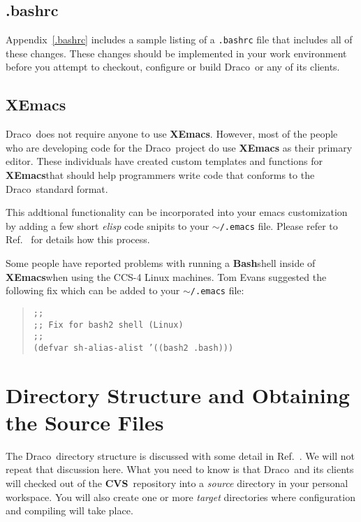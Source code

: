 \documentclass[10pt]{nmemo}
\newcommand{\comp}[1]{\normalfont\normalsize\texttt{#1}}
\newcommand{\draco}{{\normalfont\sffamily Draco}}
\newcommand{\cvs}{{\normalfont\bfseries CVS}}
\newcommand{\xemacs}{{\normalfont\bfseries XEmacs}}
\newcommand{\bash}{{\normalfont\bfseries Bash}}
\begin{document}
\subsection{.bashrc}

Appendix~\ref{.bashrc} includes a sample listing of a \comp{.bashrc}
file that includes all of these changes.  These changes should be
implemented in your work environment before you attempt to checkout,
configure or build \draco\ or any of its clients.

\subsection{\xemacs}

\draco\ does not require anyone to use \xemacs.  However, most of the
people who are developing code for the \draco\ project do use \xemacs
as their primary editor.  These individuals have created custom
templates and functions for \xemacs that should help programmers write 
code that conforms to the \draco\ standard format.

This addtional functionality can be incorporated into your emacs
customization by adding a few short \emph{elisp} code snipits to your
\comp{$\sim$/.emacs} file.  Please refer to Ref.~\cite{xtm:9909} for
details how this process.

Some people have reported problems with running a \bash shell inside
of \xemacs when using the CCS-4 Linux machines.  Tom Evans suggested
the following fix which can be added to your \comp{$\sim$/.emacs} file:

\footnotesize
\begin{verse}
\texttt{;; \\
;; Fix for bash2 shell (Linux) \\
;; \\
(defvar sh-alias-alist '((bash2 .bash)))} 
\end{verse}
\normalsize


\section{Directory Structure and Obtaining the Source Files}

The \draco\ directory structure is discussed with some detail in
Ref.~\cite{draco-build}.  We will not repeat that discussion here.
What you need to know is that \draco\ and its clients will checked out 
of the \cvs\ repository into a \emph{source} directory in your
personal workspace.  You will also create one or more \emph{target}
directories where configuration and compiling will take place.
\end{document}
